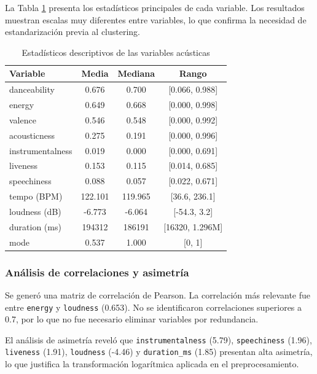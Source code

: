 La Tabla \ref{tab:estadisticos} presenta los estadísticos principales de cada variable. Los resultados muestran escalas muy diferentes entre variables, lo que confirma la necesidad de estandarización previa al clustering.

\begin{table}[htbp]
\caption{Estadísticos descriptivos de las variables acústicas}
\centering
\small
\begin{tabular}{|l|c|c|c|}
\hline
\textbf{Variable} & \textbf{Media} & \textbf{Mediana} & \textbf{Rango} \\
\hline
danceability & 0.676 & 0.700 & [0.066, 0.988] \\
energy & 0.649 & 0.668 & [0.000, 0.998] \\
valence & 0.546 & 0.548 & [0.000, 0.992] \\
acousticness & 0.275 & 0.191 & [0.000, 0.996] \\
instrumentalness & 0.019 & 0.000 & [0.000, 0.691] \\
liveness & 0.153 & 0.115 & [0.014, 0.685] \\
speechiness & 0.088 & 0.057 & [0.022, 0.671] \\
tempo (BPM) & 122.101 & 119.965 & [36.6, 236.1] \\
loudness (dB) & -6.773 & -6.064 & [-54.3, 3.2] \\
duration (ms) & 194312 & 186191 & [16320, 1.296M] \\
mode & 0.537 & 1.000 & [0, 1] \\
\hline
\end{tabular}
\label{tab:estadisticos}
\end{table}

\subsubsection{Análisis de correlaciones y asimetría}

Se generó una matriz de correlación de Pearson. La correlación más relevante fue entre \texttt{energy} y \texttt{loudness} (0.653). No se identificaron correlaciones superiores a 0.7, por lo que no fue necesario eliminar variables por redundancia.

El análisis de asimetría reveló que \texttt{instrumentalness} (5.79), \texttt{speechiness} (1.96), \texttt{liveness} (1.91), \texttt{loudness} (-4.46) y \texttt{duration\_ms} (1.85) presentan alta asimetría, lo que justifica la transformación logarítmica aplicada en el preprocesamiento.

